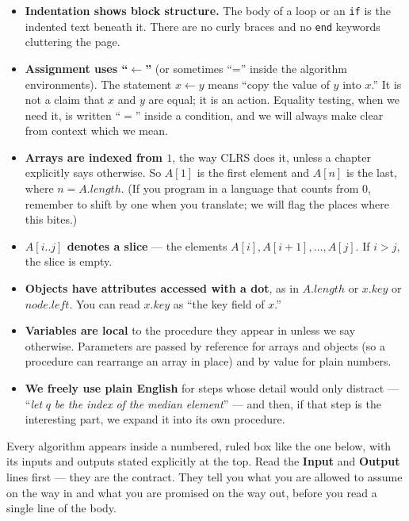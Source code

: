 \begin{itemize}
  \item \textbf{Indentation shows block structure.} The body of a loop or an
        \texttt{if} is the indented text beneath it. There are no curly braces and
        no \texttt{end} keywords cluttering the page.
  \item \textbf{Assignment uses ``$\leftarrow$''} (or sometimes ``='' inside the
        algorithm environments). The statement $x \leftarrow y$ means ``copy the
        value of $y$ into $x$.'' It is not a claim that $x$ and $y$ are equal; it
        is an action. Equality testing, when we need it, is written ``$=$'' inside
        a condition, and we will always make clear from context which we mean.
  \item \textbf{Arrays are indexed from $1$}, the way CLRS does it, unless a chapter
        explicitly says otherwise. So $A[1]$ is the first element and $A[n]$ is the
        last, where $n = A.length$. (If you program in a language that counts from
        $0$, remember to shift by one when you translate; we will flag the
        places where this bites.)
  \item \textbf{$A[i \mathbin{..} j]$ denotes a slice} --- the elements $A[i],
        A[i+1], \dots, A[j]$. If $i > j$, the slice is empty.
  \item \textbf{Objects have attributes accessed with a dot}, as in $A.length$ or
        $x.key$ or $node.left$. You can read $x.key$ as ``the key field of $x$.''
  \item \textbf{Variables are local} to the procedure they appear in unless we say
        otherwise. Parameters are passed by reference for arrays and objects (so a
        procedure can rearrange an array in place) and by value for plain numbers.
  \item \textbf{We freely use plain English} for steps whose detail would only
        distract --- ``\emph{let} $q$ \emph{be the index of the median element}'' ---
        and then, if that step is the interesting part, we expand it into its own
        procedure.
\end{itemize}

Every algorithm appears inside a numbered, ruled box like the one below, with its
inputs and outputs stated explicitly at the top. Read the \textbf{Input} and
\textbf{Output} lines first --- they are the contract. They tell you what you are
allowed to assume on the way in and what you are promised on the way out, before
you read a single line of the body.

